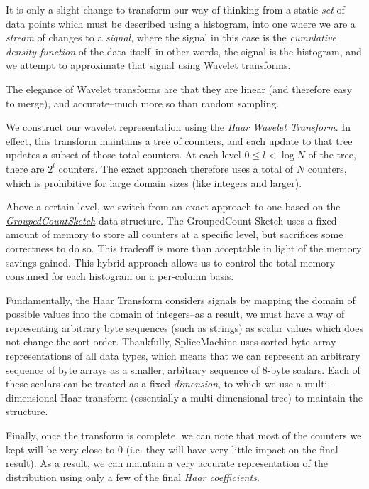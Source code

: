 It is only a slight change to transform our way of thinking from a static \emph{set} of data points which must be described using a histogram, into one where we are a \emph{stream} of changes to a \emph{signal}, where the signal in this case is the \emph{cumulative density function} of the data itself--in other words, the signal is the histogram, and we attempt to approximate that signal using Wavelet transforms.

The elegance of Wavelet transforms are that they are linear (and therefore easy to merge\cite{GilbertWaveletHistograms}), and accurate--much more so than random sampling\cite{MatiasWaveletHistogram}. 

We construct our wavelet representation using the \emph{Haar Wavelet Transform}. In effect, this transform maintains a tree of counters, and each update to that tree updates a subset of those total counters. At each level $0\leq l < \log{N}$ of the tree, there are $2^l$ counters. The exact approach therefore uses a total of $N$ counters, which is prohibitive for large domain sizes (like integers and larger). 

Above a certain level, we switch from an exact approach to one based on the \hyperref[sec:GroupedCountSketch]{\emph{GroupedCountSketch}} data structure. The GroupedCount Sketch uses a fixed amount of memory to store all counters at a specific level, but sacrifices some correctness to do so. This tradeoff is more than acceptable in light of the memory savings gained. This hybrid approach allows us to control the total memory consumed for each histogram on a per-column basis.

Fundamentally, the Haar Transform considers signals by mapping the domain of possible values into the domain of integers--as a result, we must have a way of representing arbitrary byte sequences (such as strings) as scalar values which does not change the sort order. Thankfully, SpliceMachine uses sorted byte array representations of all data types, which means that we can represent an arbitrary sequence of byte arrays as a smaller, arbitrary sequence of 8-byte scalars. Each of these scalars can be treated as a fixed \emph{dimension}, to which we use a multi-dimensional Haar transform (essentially a multi-dimensional tree) to maintain the structure.

Finally, once the transform is complete, we can note that most of the counters we kept will be very close to 0 (i.e. they will have very little impact on the final result). As a result, we can maintain a very accurate representation of the distribution using only a few of the final \emph{Haar coefficients}.


